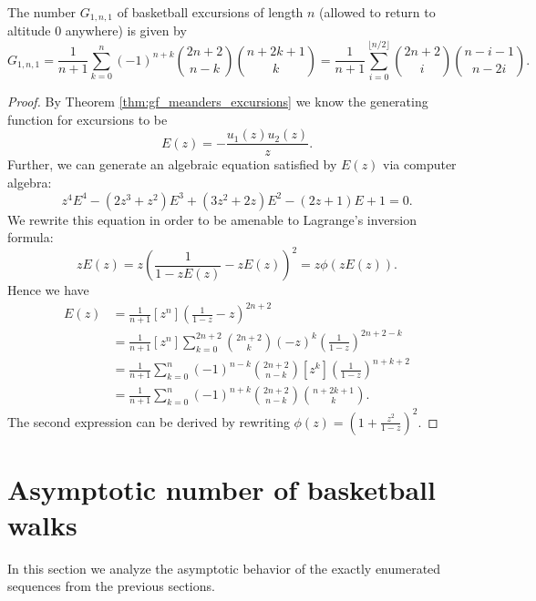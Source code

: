 \begin{proposition}
\label{prop:G11}
  The number $G_{1,n,1}$ of basketball excursions of length $n$ (allowed to return to altitude $0$ anywhere) is given by
  $$
    G_{1,n,1} = \frac{1}{n+1}\sum_{k=0}^{n}(-1)^{n+k}\binom{2n+2}{n-k}\binom{n+2k+1}{k} = 
    \frac{1}{n+1} \sum_{i=0}^{\lfloor n/2 \rfloor} \binom{2n+2}{i}\binom{n-i-1}{n-2i}.
  $$
\end{proposition}

\begin{proof}
  By Theorem \ref{thm:gf_meanders_excursions} we know the generating function for excursions to be 
  $$
    E(z) = - \frac{u_{1}(z)u_{2}(z)}{z}.
  $$
  Further, we can generate an algebraic equation satisfied by $E(z)$ via computer algebra:
  $$
    z^{4}E^{4} - (2z^{3}+z^{2})E^{3} + (3z^{2}+2z)E^{2} - (2z+1)E + 1 = 0.
  $$
  We rewrite this equation in order to be amenable to Lagrange's inversion formula:
  $$
    zE(z) = z\left(\frac{1}{1-zE(z)}-zE(z)\right)^{2} = z\phi(zE(z)).
  $$
  Hence we have
  \begin{align*}
    [z^{n}]E(z) &= \frac{1}{n+1}[z^{n}]\left(\frac{1}{1-z}-z\right)^{2n+2} \\
    &= \frac{1}{n+1}[z^n] \sum_{k=0}^{2n+2} \binom{2n+2}{k} (-z)^k \left(\frac{1}{1 - z}\right)^{2n+2-k} \\
    &= \frac{1}{n+1}\sum_{k=0}^{n} (-1)^{n-k}  \binom{2n+2}{n - k}[z^k]\left(\frac{1}{1 - z}\right)^{n+k+2} \\
    &= \frac{1}{n+1}\sum_{k=0}^{n}(-1)^{n+k}\binom{2n+2}{n-k}\binom{n+2k+1}{k}.
  \end{align*}
  The second expression can be derived by rewriting $\phi(z) = \left(1 + \frac{z^{2}}{1-z}\right)^2$.
\end{proof}

\section{Asymptotic number of basketball walks}

In this section we analyze the asymptotic behavior of the exactly enumerated sequences from the previous sections.

